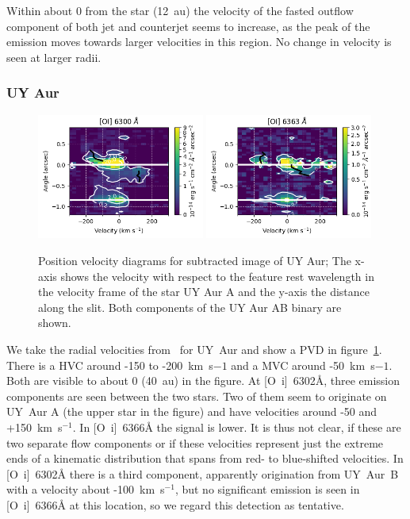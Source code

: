 \documentclass[twocolumn]{aastex62}
\begin{document}
Within about 0 from the star (12~au) the velocity of the fasted outflow component of both jet and counterjet seems to increase, as the peak of the emission moves towards larger velocities in this region. No change in velocity is seen at larger radii.

\subsubsection{UY Aur}
\begin{figure}[h!]
\begin{center}
\includegraphics[width=0.49\textwidth]{UY_Aur_6300.png}
\includegraphics[width=0.49\textwidth]{UY_Aur_6363.png}
\caption{Position velocity diagrams for subtracted
image of UY Aur; The x-axis shows the velocity with respect to the
feature rest wavelength in the velocity frame of the star UY Aur
A and the y-axis the distance along the slit. Both components of the UY Aur AB binary are shown.
\label{fig:UYAur}
}
\end{center}
\end{figure}
We take the radial velocities from~\citet{2012ApJ...745..119N} for UY~Aur and show a PVD in figure~\ref{fig:UYAur}. There is a HVC around -150 to -200~km~s${-1}$ and a MVC around -50~km~s${-1}$. Both are visible to about 0 (40~au) in the figure. At [O~{\sc i}]~6302\AA{}, three emission components are seen between the two stars. Two of them seem to originate on UY~Aur A (the upper star in the figure) and have velocities around -50 and +150~km~s$^{-1}$. In [O~{\sc i}]~6366\AA{} the signal is lower. It is thus not clear, if these are two separate flow components or if these velocities represent just the extreme ends of a kinematic distribution that spans from red- to blue-shifted velocities. In [O~{\sc i}]~6302\AA{} there is a third component, apparently origination from UY~Aur~B with a velocity about -100~km~s$^{-1}$, but no significant emission is seen in [O~{\sc i}]~6366\AA{} at this location, so we regard this detection as tentative.
\end{document}
